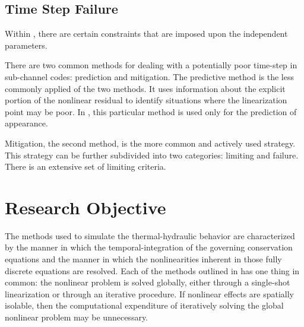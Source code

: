 \subsection{Time Step Failure}
\label{subsect:time_step_failure}
Within \cobra, there are certain constraints that are imposed upon the independent parameters.

There are two common methods for dealing with a potentially poor time-step in sub-channel codes: prediction and mitigation.
The predictive method is the less commonly applied of the two methods.
It uses information about the explicit portion of the nonlinear residual to identify situations where the linearization point may be poor.
In \cobra, this particular method is used only for the prediction of \ncg appearance.

Mitigation, the second method, is the more common and actively used strategy.
This strategy can be further subdivided into two categories: limiting and failure.
There is an extensive set of limiting criteria.
\section{Research Objective}
The methods used to simulate the thermal-hydraulic behavior are characterized by the manner in which the temporal-integration of the governing conservation equations and the manner in which the nonlinearities inherent in those fully discrete equations are resolved.
Each of the methods outlined in  has one thing in common: the nonlinear problem is solved globally, either through a single-shot linearization or through an iterative procedure.
If nonlinear effects are spatially isolable, then the computational expenditure of iteratively solving the global nonlinear problem may be unnecessary.


